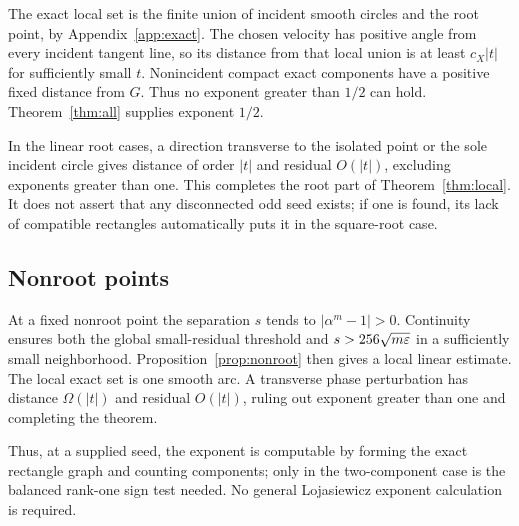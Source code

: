 The exact local set is the finite union of incident smooth circles and the root point, by Appendix~\ref{app:exact}. The chosen velocity has positive angle from every incident tangent line, so its distance from that local union is at least $c_X|t|$ for sufficiently small $t$. Nonincident compact exact components have a positive fixed distance from $G$. Thus no exponent greater than $1/2$ can hold. Theorem~\ref{thm:all} supplies exponent $1/2$.

In the linear root cases, a direction transverse to the isolated point or the sole incident circle gives distance of order $|t|$ and residual $O(|t|)$, excluding exponents greater than one. This completes the root part of Theorem~\ref{thm:local}. It does not assert that any disconnected odd seed exists; if one is found, its lack of compatible rectangles automatically puts it in the square-root case.

\subsection{Nonroot points}
At a fixed nonroot point the separation $s$ tends to $|\alpha^m-1|>0$. Continuity ensures both the global small-residual threshold and $s>256\sqrt{m\varepsilon}$ in a sufficiently small neighborhood. Proposition~\ref{prop:nonroot} then gives a local linear estimate. The local exact set is one smooth arc. A transverse phase perturbation has distance $\Omega(|t|)$ and residual $O(|t|)$, ruling out exponent greater than one and completing the theorem.

Thus, at a supplied seed, the exponent is computable by forming the exact rectangle graph and counting components; only in the two-component case is the balanced rank-one sign test needed. No general Lojasiewicz exponent calculation is required.
